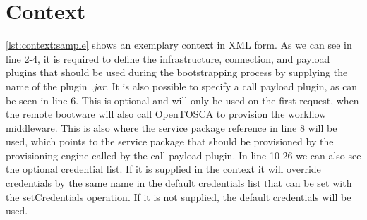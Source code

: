 \section{Context}
\label{implementation:context}

\vspace*{\baselineskip}

\autoref{lst:context:sample} shows an exemplary context in XML form.
As we can see in line 2-4, it is required to define the infrastructure, connection, and payload plugins that should be used during the bootstrapping process by supplying the name of the plugin \textit{.jar}.
It is also possible to specify a call payload plugin, as can be seen in line 6.
This is optional and will only be used on the first request, when the remote bootware will also call OpenTOSCA to provision the workflow middleware.
This is also where the service package reference in line 8 will be used, which points to the service package that should be provisioned by the provisioning engine called by the call payload plugin.
In line 10-26 we can also see the optional credential list.
If it is supplied in the context it will override credentials by the same name in the default credentials list that can be set with the setCredentials operation.
If it is not supplied, the default credentials will be used.
